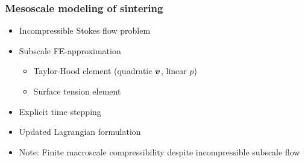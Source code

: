 \documentclass[11pt]{beamer} %
\begin{document}
\begin{frame}
 \frametitle{Mesoscale modeling of sintering}

 \begin{itemize}
  \item Incompressible Stokes flow problem
  \item Subscale FE-approximation
  \begin{itemize}
    \item Taylor-Hood element (quadratic $\boldsymbol{v}$, linear $p$)
    \item Surface tension element
  \end{itemize}
  \item Explicit time stepping
  \item Updated Lagrangian formulation
  \item \alert{Note: Finite macroscale compressibility despite incompressible subscale flow}
 \end{itemize}


\end{frame}
\end{document}
